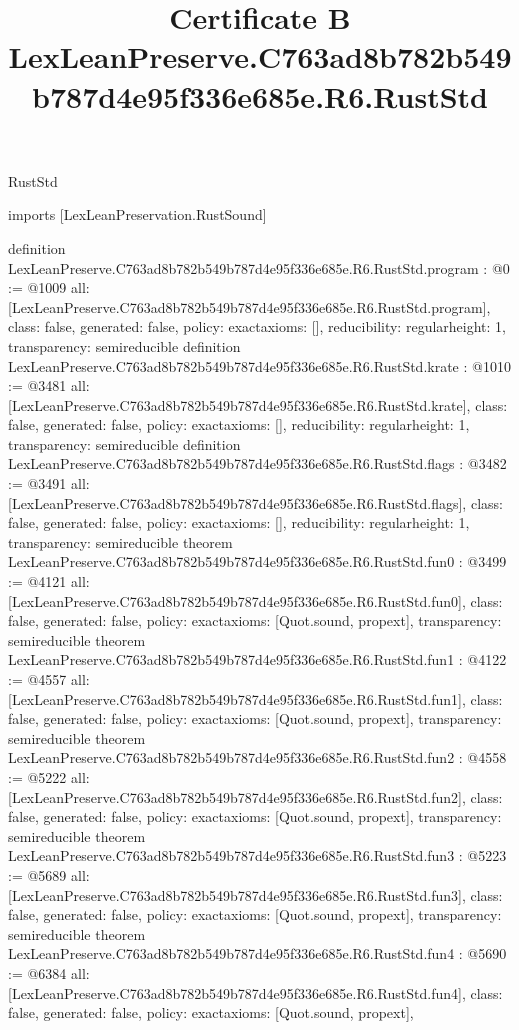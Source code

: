 \begin{lexlean}{RustStd}
\title{Certificate B LexLeanPreserve.C763ad8b782b549b787d4e95f336e685e.R6.RustStd}
\begin{coremodule}
imports [LexLeanPreservation.RustSound]

definition LexLeanPreserve.C763ad8b782b549b787d4e95f336e685e.R6.RustStd.program : @0 := @1009 {
  all: [LexLeanPreserve.C763ad8b782b549b787d4e95f336e685e.R6.RustStd.program],
  class: false,
  generated: false,
  policy: exact{axioms: []},
  reducibility: regular{height: 1},
  transparency: semireducible
}
definition LexLeanPreserve.C763ad8b782b549b787d4e95f336e685e.R6.RustStd.krate : @1010 := @3481 {
  all: [LexLeanPreserve.C763ad8b782b549b787d4e95f336e685e.R6.RustStd.krate],
  class: false,
  generated: false,
  policy: exact{axioms: []},
  reducibility: regular{height: 1},
  transparency: semireducible
}
definition LexLeanPreserve.C763ad8b782b549b787d4e95f336e685e.R6.RustStd.flags : @3482 := @3491 {
  all: [LexLeanPreserve.C763ad8b782b549b787d4e95f336e685e.R6.RustStd.flags],
  class: false,
  generated: false,
  policy: exact{axioms: []},
  reducibility: regular{height: 1},
  transparency: semireducible
}
theorem LexLeanPreserve.C763ad8b782b549b787d4e95f336e685e.R6.RustStd.fun0 : @3499 := @4121 {
  all: [LexLeanPreserve.C763ad8b782b549b787d4e95f336e685e.R6.RustStd.fun0],
  class: false,
  generated: false,
  policy: exact{axioms: [Quot.sound, propext]},
  transparency: semireducible
}
theorem LexLeanPreserve.C763ad8b782b549b787d4e95f336e685e.R6.RustStd.fun1 : @4122 := @4557 {
  all: [LexLeanPreserve.C763ad8b782b549b787d4e95f336e685e.R6.RustStd.fun1],
  class: false,
  generated: false,
  policy: exact{axioms: [Quot.sound, propext]},
  transparency: semireducible
}
theorem LexLeanPreserve.C763ad8b782b549b787d4e95f336e685e.R6.RustStd.fun2 : @4558 := @5222 {
  all: [LexLeanPreserve.C763ad8b782b549b787d4e95f336e685e.R6.RustStd.fun2],
  class: false,
  generated: false,
  policy: exact{axioms: [Quot.sound, propext]},
  transparency: semireducible
}
theorem LexLeanPreserve.C763ad8b782b549b787d4e95f336e685e.R6.RustStd.fun3 : @5223 := @5689 {
  all: [LexLeanPreserve.C763ad8b782b549b787d4e95f336e685e.R6.RustStd.fun3],
  class: false,
  generated: false,
  policy: exact{axioms: [Quot.sound, propext]},
  transparency: semireducible
}
theorem LexLeanPreserve.C763ad8b782b549b787d4e95f336e685e.R6.RustStd.fun4 : @5690 := @6384 {
  all: [LexLeanPreserve.C763ad8b782b549b787d4e95f336e685e.R6.RustStd.fun4],
  class: false,
  generated: false,
  policy: exact{axioms: [Quot.sound, propext]},
}
\end{coremodule}
\end{lexlean}
